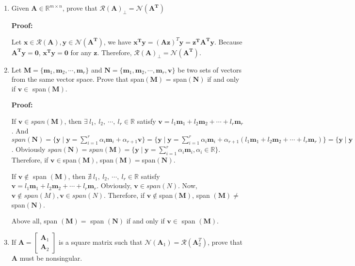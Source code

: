 \documentclass[12pt, letterpaper, onecolumn]{article}
\begin{document}
\begin{enumerate}[start=2]
{\begin{enumerate}
                Conclution: $\mathcal{N}(\bm{A})$ is a subspace.

			\end{enumerate}
			}

		\item Given $\bm{A}\in\mathbb{R}^{m\times n}$, prove that $\mathcal{R}(\bm{A})_{\bot}=\mathcal{N}(\bm{A^T})$ %
		
		\textbf{Proof:}
		
        Let $\bm{x} \in \mathcal{R}(\bm{A}), \bm{y} \in \mathcal{N}(\bm{A^T})$, we have $\bm{x^T} \bm{y} = (\bm{Az})^T\bm{y} = \bm{z^TA^Ty}$. Because $\bm{A^Ty} = \bm{0}$, $\bm{x^T} \bm{y} = \bm{0}$ for any $\bm{z}$. Therefore, $\mathcal{R}(\bm{A})_{\bot}=\mathcal{N}(\bm{A^T})$.

		\item Let $\bm{M}=\{\bm{m}_1,\bm{m}_2,\cdots,\bm{m}_r\}$ and $\bm{N}=\{\bm{m}_1,\bm{m}_2,\cdots,\bm{m}_r,\bm{v}\}$ 
		be two sets of vectors from the same vector space. 
		Prove that span$(\bm{M})$ = span$(\bm{N})$ if and only if $\bm{v}\in$ span$(\bm{M})$.%

		\textbf{Proof:}

        If $\bm{v}\in span(\bm{M})$, then $\exists\ l_{1},\ l_{2},\ \cdots,\ l_{r}\in\mathbb{R}$ satisfy $\bm{v}=l_{1}\bm{m}_{1}+l_{2}\bm{m}_{2}+\cdots+l_{r}\bm{m}_{r}$. And $span(\bm{N})=\{\bm{y}\mid\bm{y}=\sum\limits_{i=1}^{r}\alpha_{i}\bm{m}_{i}+\alpha_{r+1}\bm{v}\}= \{\bm{y}\mid\bm{y}=\sum\limits_{i=1}^{r}\alpha_{i}\bm{m}_{i}+\alpha_{r+1}(l_{1}\bm{m}_{1}+l_{2}\bm{m}_{2}+\cdots+l_{r}\bm{m}_{r})\}= \{\bm{y}\mid\bm{y}=\sum\limits_{i=1}^{r}\beta_{i}\bm{m}_{i},\beta_{i}=\alpha_{i}+\alpha_{r+1}l_{i}\in\mathbb{R}\}$. Obviously $span(\bm{N}) = span(\bm{M}) =\{\bm{y}\mid\bm{y}=\sum\limits_{i=1}^{r}\alpha_{i}\bm{m}_{i},\alpha_{i}\in\mathbb{R}\}$. Therefore, if $\bm{v}\in$span$ (\bm{M}) $, span$ (\bm{M})=$span$ (\bm{N})$.

        If $\bm{v}\notin $ span $ (\bm{M}) $, then $\nexists\ l_{1},\ l_{2},\ \cdots,\ l_{r}\in\mathbb{R}$ satisfy $\bm{v}=l_{1}\bm{m}_{1}+l_{2}\bm{m}_{2}+\cdots+l_{r}\bm{m}_{r}$. Obviously, $\bm{v} \in span(N)$. Now, $\bm{v} \notin span(M), \bm{v} \in span(N)$. Therefore, if $\bm{v}\notin$span$(\bm{M})$, span $(\bm{M})\neq$span$(\bm{N})$.
		
		Above all, span $(\bm{M})=$ span $(\bm{N})$ if and only if $\bm{v}\in$ span $(\bm{M})$.

		\item If 
		$
		\bm{A}=
		\begin{bmatrix}
			\bm{A}_1 \\ \bm{A}_2
		\end{bmatrix}
		$
		is a square matrix such that $\mathcal{N}(\bm{A}_1)=\mathcal{R}(\bm{A}^T_2)$, prove that $\bm{A}$ must be nonsingular.%


\end{enumerate}
\end{document}
